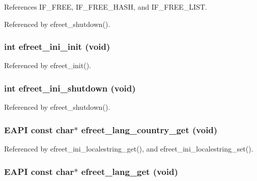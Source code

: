 References IF\_\-FREE, IF\_\-FREE\_\-HASH, and IF\_\-FREE\_\-LIST.

Referenced by efreet\_\-shutdown().
\subsubsection[efreet\_\-ini\_\-init]{\setlength{\rightskip}{0pt plus 5cm}int efreet\_\-ini\_\-init (void)}\label{group__Efreet__Private_g01cd5a4ab8ef6c330422a33da2ee2468}




Referenced by efreet\_\-init().
\subsubsection[efreet\_\-ini\_\-shutdown]{\setlength{\rightskip}{0pt plus 5cm}int efreet\_\-ini\_\-shutdown (void)}\label{group__Efreet__Private_ge631a37f96b17a561329b08e47abeef9}




Referenced by efreet\_\-shutdown().
\subsubsection[efreet\_\-lang\_\-country\_\-get]{\setlength{\rightskip}{0pt plus 5cm}EAPI const char$\ast$ efreet\_\-lang\_\-country\_\-get (void)}\label{group__Efreet__Private_ga02d2cfe1b6e73fae0db22fc6724990a}




Referenced by efreet\_\-ini\_\-localestring\_\-get(), and efreet\_\-ini\_\-localestring\_\-set().
\subsubsection[efreet\_\-lang\_\-get]{\setlength{\rightskip}{0pt plus 5cm}EAPI const char$\ast$ efreet\_\-lang\_\-get (void)}\label{group__Efreet__Private_gad9f11f7cd0aefb4ff95bc116dab5321}




